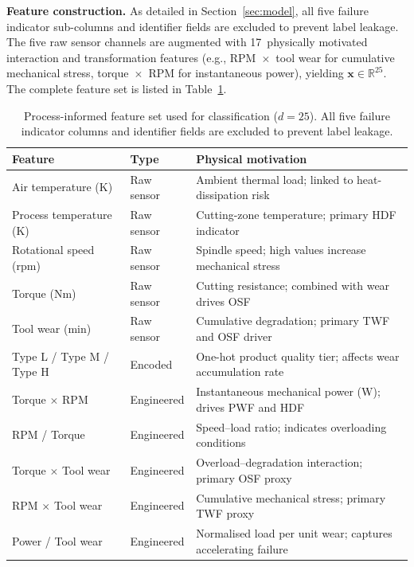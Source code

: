 \documentclass[sensors,article,submit,pdftex,moreauthors]{Definitions/mdpi}
\newcommand{\mdpitablefont}{\footnotesize}
\begin{document}
\textbf{Feature construction.}
As detailed in Section~\ref{sec:model}, all five failure indicator
sub-columns and identifier fields are excluded to prevent label
leakage.
The five raw sensor channels are augmented with 17~physically
motivated interaction and transformation features (e.g., RPM~$\times$~tool
wear for cumulative mechanical stress, torque~$\times$~RPM for
instantaneous power), yielding $\mathbf{x} \in \mathbb{R}^{25}$.
The complete feature set is listed in Table~\ref{tab:features}.

\begin{table}[H]
\caption{Process-informed feature set used for classification
($d = 25$). All five failure indicator columns and identifier fields
are excluded to prevent label leakage.\label{tab:features}}
\centering
\mdpitablefont
\begin{tabularx}{\textwidth}{llX}
\toprule
\textbf{Feature} & \textbf{Type} & \textbf{Physical motivation} \\
\midrule
Air temperature (K)             & Raw sensor  & Ambient thermal load; linked to heat-dissipation risk \\
Process temperature (K)         & Raw sensor  & Cutting-zone temperature; primary HDF indicator \\
Rotational speed (rpm)          & Raw sensor  & Spindle speed; high values increase mechanical stress \\
Torque (Nm)                     & Raw sensor  & Cutting resistance; combined with wear drives OSF \\
Tool wear (min)                 & Raw sensor  & Cumulative degradation; primary TWF and OSF driver \\
Type L / Type M / Type H        & Encoded     & One-hot product quality tier; affects wear accumulation rate \\
\midrule
Torque $\times$ RPM             & Engineered  & Instantaneous mechanical power (W); drives PWF and HDF \\
RPM / Torque                    & Engineered  & Speed--load ratio; indicates overloading conditions \\
Torque $\times$ Tool wear       & Engineered  & Overload--degradation interaction; primary OSF proxy \\
RPM $\times$ Tool wear          & Engineered  & Cumulative mechanical stress; primary TWF proxy \\
Power / Tool wear               & Engineered  & Normalised load per unit wear; captures accelerating failure \\

\end{tabularx}
\end{table}
\end{document}
